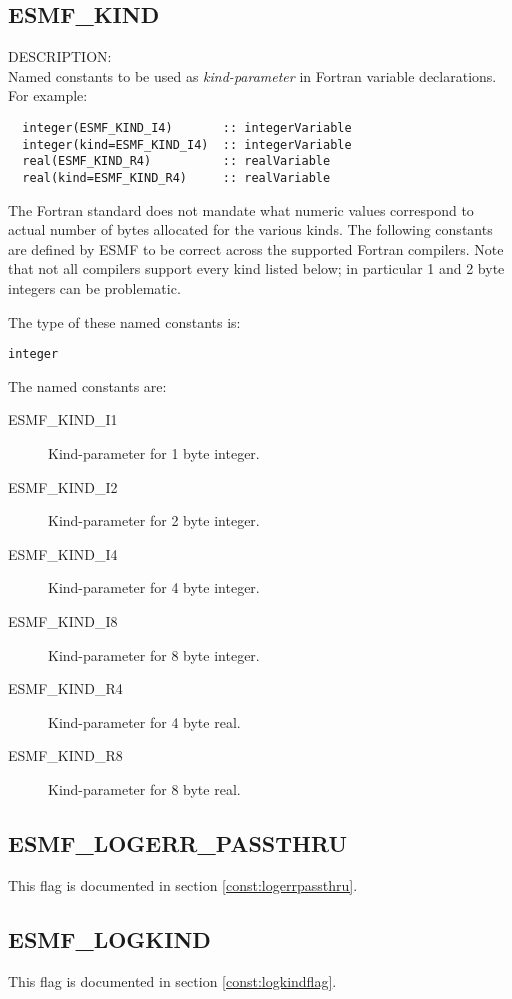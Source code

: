 \subsection{ESMF\_KIND}
\label{const:kind}

{\sf DESCRIPTION:\\}
Named constants to be used as {\em kind-parameter} in Fortran variable
declarations. For example:
\begin{verbatim}
  integer(ESMF_KIND_I4)       :: integerVariable
  integer(kind=ESMF_KIND_I4)  :: integerVariable
  real(ESMF_KIND_R4)          :: realVariable
  real(kind=ESMF_KIND_R4)     :: realVariable
\end{verbatim}
The Fortran standard does not mandate what numeric values correspond to
actual number of bytes allocated for the various kinds. The following constants
are defined by ESMF to be correct across the supported Fortran compilers.
Note that not all compilers support every kind listed below; in particular
1 and 2 byte integers can be problematic.

The type of these named constants is:

{\tt integer}

The named constants are:
\begin{description}
\item [ESMF\_KIND\_I1]
      Kind-parameter for 1 byte integer.
\item [ESMF\_KIND\_I2]
      Kind-parameter for 2 byte integer.
\item [ESMF\_KIND\_I4]
      Kind-parameter for 4 byte integer.
\item [ESMF\_KIND\_I8]
      Kind-parameter for 8 byte integer.
\item [ESMF\_KIND\_R4]
      Kind-parameter for 4 byte real.
\item [ESMF\_KIND\_R8]
      Kind-parameter for 8 byte real.
\end{description}

\subsection{ESMF\_LOGERR\_PASSTHRU}
This flag is documented in section \ref{const:logerrpassthru}.

\subsection{ESMF\_LOGKIND}
This flag is documented in section \ref{const:logkindflag}.

